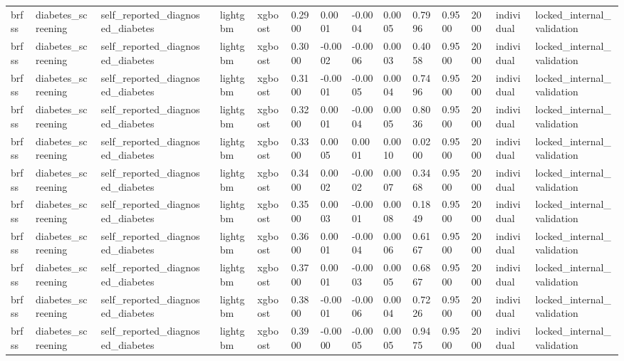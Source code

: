 \begin{tabular}{lllllllllllllll}
brfss & diabetes\_screening & self\_reported\_diagnosed\_diabetes &  & lightgbm & xgboost & 0.2900 & 0.0001 & -0.0004 & 0.0005 & 0.7996 & 0.9500 & 2000 & individual & locked\_internal\_validation \\
brfss & diabetes\_screening & self\_reported\_diagnosed\_diabetes &  & lightgbm & xgboost & 0.3000 & -0.0002 & -0.0006 & 0.0003 & 0.4058 & 0.9500 & 2000 & individual & locked\_internal\_validation \\
brfss & diabetes\_screening & self\_reported\_diagnosed\_diabetes &  & lightgbm & xgboost & 0.3100 & -0.0001 & -0.0005 & 0.0004 & 0.7496 & 0.9500 & 2000 & individual & locked\_internal\_validation \\
brfss & diabetes\_screening & self\_reported\_diagnosed\_diabetes &  & lightgbm & xgboost & 0.3200 & 0.0001 & -0.0004 & 0.0005 & 0.8036 & 0.9500 & 2000 & individual & locked\_internal\_validation \\
brfss & diabetes\_screening & self\_reported\_diagnosed\_diabetes &  & lightgbm & xgboost & 0.3300 & 0.0005 & 0.0001 & 0.0010 & 0.0200 & 0.9500 & 2000 & individual & locked\_internal\_validation \\
brfss & diabetes\_screening & self\_reported\_diagnosed\_diabetes &  & lightgbm & xgboost & 0.3400 & 0.0002 & -0.0002 & 0.0007 & 0.3468 & 0.9500 & 2000 & individual & locked\_internal\_validation \\
brfss & diabetes\_screening & self\_reported\_diagnosed\_diabetes &  & lightgbm & xgboost & 0.3500 & 0.0003 & -0.0001 & 0.0008 & 0.1849 & 0.9500 & 2000 & individual & locked\_internal\_validation \\
brfss & diabetes\_screening & self\_reported\_diagnosed\_diabetes &  & lightgbm & xgboost & 0.3600 & 0.0001 & -0.0004 & 0.0006 & 0.6167 & 0.9500 & 2000 & individual & locked\_internal\_validation \\
brfss & diabetes\_screening & self\_reported\_diagnosed\_diabetes &  & lightgbm & xgboost & 0.3700 & 0.0001 & -0.0003 & 0.0005 & 0.6867 & 0.9500 & 2000 & individual & locked\_internal\_validation \\
brfss & diabetes\_screening & self\_reported\_diagnosed\_diabetes &  & lightgbm & xgboost & 0.3800 & -0.0001 & -0.0006 & 0.0004 & 0.7226 & 0.9500 & 2000 & individual & locked\_internal\_validation \\
brfss & diabetes\_screening & self\_reported\_diagnosed\_diabetes &  & lightgbm & xgboost & 0.3900 & -0.0000 & -0.0005 & 0.0005 & 0.9475 & 0.9500 & 2000 & individual & locked\_internal\_validation \\

\end{tabular}
